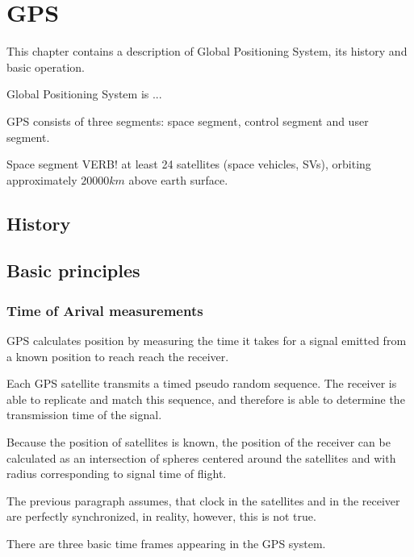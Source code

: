 \chapter{GPS}

This chapter contains a description of Global Positioning System,
its history and basic operation.

Global Positioning System is ...

GPS consists of three segments: space segment, control segment and user segment.

Space segment VERB! at least 24 satellites (space vehicles, SVs), orbiting
approximately \(20000 km\) above earth surface.

\section{History}

\section{Basic principles}

\subsection{Time of Arival measurements}

GPS calculates position by measuring the time it takes for a signal
emitted from a known position to reach reach the receiver.

Each GPS satellite transmits a timed pseudo random sequence.
The receiver is able to replicate and match this sequence, and therefore
is able to determine the transmission time of the signal.

Because the position of satellites is known, the position of the receiver
can be calculated as an intersection of spheres centered around the satellites
and with radius corresponding to signal time of flight.

The previous paragraph assumes, that clock in the satellites and in the receiver 
are perfectly synchronized, in reality, however, this is not true.

There are three basic time frames appearing in the GPS system.

